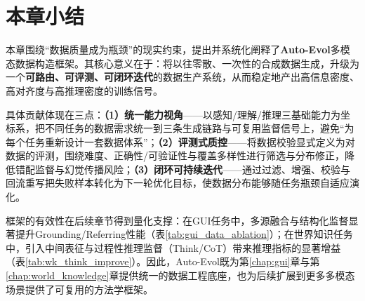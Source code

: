 \section{本章小结}
本章围绕“数据质量成为瓶颈”的现实约束，提出并系统化阐释了\textbf{Auto-Evol}多模态数据构造框架。其核心意义在于：将以往零散、一次性的合成数据生成，升级为一个\textbf{可路由、可评测、可闭环迭代}的数据生产系统，从而稳定地产出高信息密度、高对齐度与高推理密度的训练信号。

具体贡献体现在三点：\textbf{（1）统一能力视角}——以感知/理解/推理三基础能力为坐标系，把不同任务的数据需求统一到三条生成链路与可复用监督信号上，避免“为每个任务重新设计一套数据体系”；\textbf{（2）评测式质控}——将数据校验显式定义为对数据的评测，围绕难度、正确性/可验证性与覆盖多样性进行筛选与分布修正，降低错配监督与幻觉传播风险；\textbf{（3）闭环可持续迭代}——通过过滤、增强、校验与回流重写把失败样本转化为下一轮优化目标，使数据分布能够随任务瓶颈自适应演化。

框架的有效性在后续章节得到量化支撑：在GUI任务中，多源融合与结构化监督显著提升Grounding/Referring性能（表\ref{tab:gui_data_ablation}）；在世界知识任务中，引入中间表征与过程性推理监督（Think/CoT）带来推理指标的显著增益（表\ref{tab:wk_think_improve}）。因此，Auto-Evol既为第\ref{chap:gui}章与第\ref{chap:world_knowledge}章提供统一的数据工程底座，也为后续扩展到更多多模态场景提供了可复用的方法学框架。

